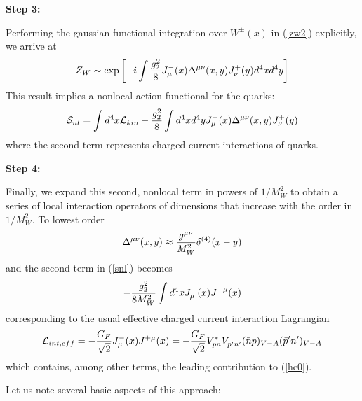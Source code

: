 \documentclass[12pt]{article}
\newcommand{\eqn}{\ref}
\begin{document}
\begin{itemize}
\begin{itemize}
{\bf Step 3:}

Performing the gaussian functional integration over $W^\pm(x)$ in
(\eqn{zw2}) explicitly, we arrive at
\begin{equation}\label{zetw}
Z_W\sim\exp\left[ -i\int{g^2_2\over 8}J^-_\mu(x)\Delta^{\mu\nu}(x, y)
J^+_\nu(y) d^4x d^4y \right]   \end{equation}
This  result implies a nonlocal action functional for the quarks:
\begin{equation}\label{snl}
{\cal S}_{nl}=\int d^4x {\cal L}_{kin}-
{g^2_2\over 8}\int d^4x d^4y J^-_\mu(x)\Delta^{\mu\nu}(x, y)
J^+_\nu(y)    \end{equation}
where the second term represents
 charged current interactions of quarks.

{\bf Step 4:}

Finally, we expand this second, nonlocal term in powers of
$1/M^2_W$ to obtain a series of local interaction operators of
dimensions that increase with the order in $1/M^2_W$. To lowest order
\begin{equation}\label{dloc}
\Delta^{\mu\nu}(x, y)\approx{g^{\mu\nu}\over M^2_W}\delta^{(4)}(x-y) 
\end{equation}
and the second term in (\eqn{snl}) becomes
\begin{equation}\label{jjx}
-{g^2_2\over 8M^2_W}\int d^4x J^-_\mu(x) J^{+\mu}(x)  \end{equation}
corresponding to the usual effective charged current interaction
Lagrangian
\begin{equation}\label{leff}
{\cal L}_{int,eff}=-{G_F\over\sqrt{2}} J^-_\mu(x) J^{+\mu}(x)=-
{G_F\over\sqrt{2}}V^*_{pn}V_{p'n'}^{}(\bar np)_{V-A}
  (\bar p'n')_{V-A}
\end{equation}
which contains, among other terms, the leading contribution to 
(\ref{hc0}).

Let us note several  basic aspects of this approach:


\end{itemize}
\end{itemize}
\end{document}
